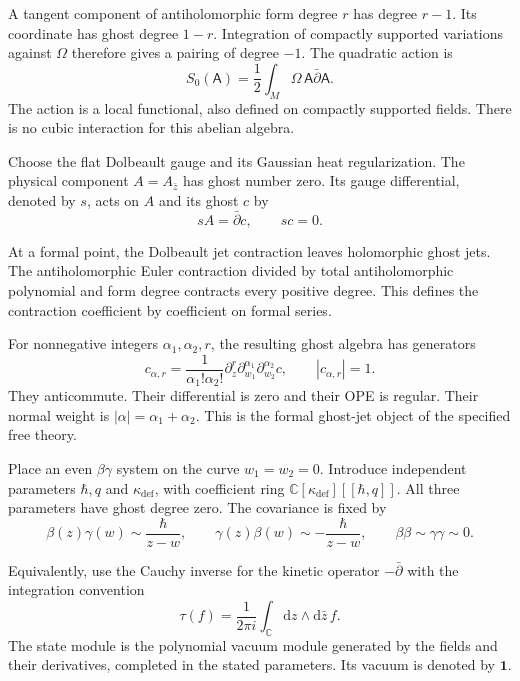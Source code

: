 A tangent component of antiholomorphic form degree $r$ has degree
$r-1$. Its coordinate has ghost degree $1-r$.
Integration of compactly supported variations against $\Omega$
therefore gives a pairing of degree $-1$. The quadratic action is
\begin{equation}\label{cylocal:eq:bulk-action}
 S_0(\mathsf A)=\frac12\int_M\Omega\,
                   \mathsf A\bar\partial\mathsf A.
\end{equation}
The action is a local functional, also defined on compactly
supported fields. There is no cubic interaction for this abelian algebra.

Choose the flat Dolbeault gauge and its Gaussian heat regularization.
The physical component $A=A_{\bar z}$ has ghost number zero.
Its gauge differential, denoted by $s$, acts on $A$ and its ghost $c$ by
\[
 sA=\bar\partial c,\qquad sc=0.
\]

At a formal point, the Dolbeault jet contraction leaves holomorphic
ghost jets. The antiholomorphic Euler contraction divided by total
antiholomorphic polynomial and form degree contracts every positive
degree. This defines the contraction coefficient by coefficient
on formal series.

For nonnegative integers $\alpha_1,\alpha_2,r$,
the resulting ghost algebra has generators
\[
 c_{\alpha,r}=\frac{1}{\alpha_1!\alpha_2!}
  \partial_z^r\partial_{w_1}^{\alpha_1}
                    \partial_{w_2}^{\alpha_2}c,
 \qquad |c_{\alpha,r}|=1.
\]
They anticommute. Their differential is zero and their OPE is regular.
Their normal weight is $|\alpha|=\alpha_1+\alpha_2$.
This is the formal ghost-jet object of the specified free theory.

Place an even $\beta\gamma$ system on the curve
$w_1=w_2=0$. Introduce independent parameters
$\hbar,q$ and $\kappa_{\mathrm{def}}$, with coefficient ring
$\mathbb C[\kappa_{\mathrm{def}}][[\hbar,q]]$.
All three parameters have ghost degree zero.
The covariance is fixed by
\begin{equation}\label{cylocal:eq:covariance}
 \beta(z)\gamma(w)\sim\frac{\hbar}{z-w},\qquad
 \gamma(z)\beta(w)\sim-\frac{\hbar}{z-w},\qquad
 \beta\beta\sim\gamma\gamma\sim0.
\end{equation}

Equivalently, use the Cauchy inverse for the kinetic operator
$-\bar\partial$ with the integration convention
\[
 \tau(f)=\frac{1}{2\pi i}\int_{\mathbb C}
                 \mathrm dz\wedge\mathrm d\bar z\,f.
\]
The state module is the polynomial vacuum module generated by the
fields and their derivatives, completed in the stated parameters.
Its vacuum is denoted by $\mathbf1$.

